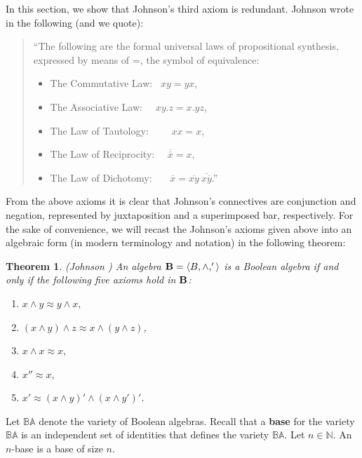\documentclass{amsart}
\theoremstyle{plain}
\newtheorem{theorem}{Theorem}[section]
\theoremstyle{problem}
\theoremstyle{definition}
\theoremstyle{remark}
\numberwithin{equation}{section}
\begin{document}
In this section, we show that Johnson's third axiom is redundant.
 Johnson wrote in \cite{Jo92c} the following (and we quote):
 




\begin{quote}

 
 ``The following are the formal universal laws of propositional
 synthesis, expressed by means of =, the symbol of equivalence:
 \begin{itemize}
 \item[I] The Commutative Law: \ $xy = yx,$
 \item[II] The Associative Law: \quad \ \ $xy.z = x.yz$,
\item[III] The Law of Tautology: \ \ \ \ $xx = x, $ 
\item[IV] The Law of Reciprocity: \ \ $\overline{\overline{x}} = x,$   %
\item[V] The Law of Dichotomy: \ \ \  $\overline{x} = \overline{xy}\ \overline{x\overline{y}}$.'' \\ %
\end{itemize}
\end{quote}

From the above axioms it is clear that Johnson's connectives are conjunction and negation, represented by juxtaposition and a superimposed bar, respectively.
For the sake of convenience, we will recast the Johnson's axioms given above into an algebraic form (in modern terminology and notation) in the following theorem:


\begin{theorem}{\rm(}Johnson \cite{Jo92c}{\rm)} An algebra ${\bf B} = \langle B, \land, ' \rangle$ is a
    {\it Boolean algebra} if and only if the following five axioms hold in ${\bf B}$:
\begin{enumerate}
   \item[{\rm(J1)}] $x \land y \approx y \land x,$
      \item[{\rm(J2)}] $(x \land y) \land z \approx x \land (y \land z)$,
   \item[{\rm(J3)}] ${x \land x  \approx x},$  
   \item[{\rm(J4)}]  ${x'' \approx x},$
   \item[{\rm(J5)}] ${x' \approx (x \land y)' \land (x \land y')'}$.
\end{enumerate}
\end{theorem}

Let $\mathbb{BA}$ denote the variety of Boolean algebras.  Recall that a {\bf base} for the variety $\mathbb{BA}$ is an independent set of identities that defines the variety $\mathbb{BA}$. Let $n \in \mathbb{N}$.  An $n$-base is a base of size $n$.
\end{document}
